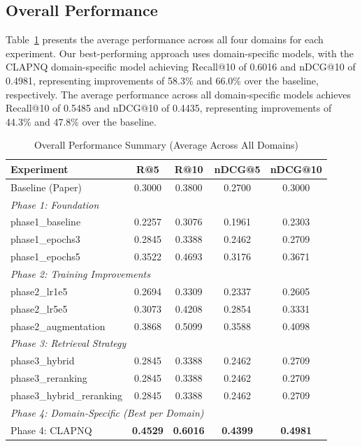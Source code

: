 \documentclass[conference]{IEEEtran}
\begin{document}
\subsection{Overall Performance}

Table~\ref{tab:overall_results} presents the average performance across all four domains for each experiment. Our best-performing approach uses domain-specific models, with the CLAPNQ domain-specific model achieving Recall@10 of 0.6016 and nDCG@10 of 0.4981, representing improvements of 58.3\% and 66.0\% over the baseline, respectively. The average performance across all domain-specific models achieves Recall@10 of 0.5485 and nDCG@10 of 0.4435, representing improvements of 44.3\% and 47.8\% over the baseline.

\begin{table}[htbp]
\centering
\caption{Overall Performance Summary (Average Across All Domains)}
\label{tab:overall_results}
\footnotesize
\begin{tabular}{lcccc}
\toprule
\textbf{Experiment} & \textbf{R@5} & \textbf{R@10} & \textbf{nDCG@5} & \textbf{nDCG@10} \\
\midrule
Baseline (Paper) & 0.3000 & 0.3800 & 0.2700 & 0.3000 \\
\midrule
\multicolumn{5}{l}{\textit{Phase 1: Foundation}} \\
phase1\_baseline & 0.2257 & 0.3076 & 0.1961 & 0.2303 \\
phase1\_epochs3 & 0.2845 & 0.3388 & 0.2462 & 0.2709 \\
phase1\_epochs5 & 0.3522 & 0.4693 & 0.3176 & 0.3671 \\
\midrule
\multicolumn{5}{l}{\textit{Phase 2: Training Improvements}} \\
phase2\_lr1e5 & 0.2694 & 0.3309 & 0.2337 & 0.2605 \\
phase2\_lr5e5 & 0.3073 & 0.4208 & 0.2854 & 0.3331 \\
phase2\_augmentation & 0.3868 & 0.5099 & 0.3588 & 0.4098 \\
\midrule
\multicolumn{5}{l}{\textit{Phase 3: Retrieval Strategy}} \\
phase3\_hybrid & 0.2845 & 0.3388 & 0.2462 & 0.2709 \\
phase3\_reranking & 0.2845 & 0.3388 & 0.2462 & 0.2709 \\
phase3\_hybrid\_reranking & 0.2845 & 0.3388 & 0.2462 & 0.2709 \\
\midrule
\multicolumn{5}{l}{\textit{Phase 4: Domain-Specific (Best per Domain)}} \\
Phase 4: CLAPNQ & \textbf{0.4529} & \textbf{0.6016} & \textbf{0.4399} & \textbf{0.4981} \\

\end{tabular}
\end{table}
\end{document}
